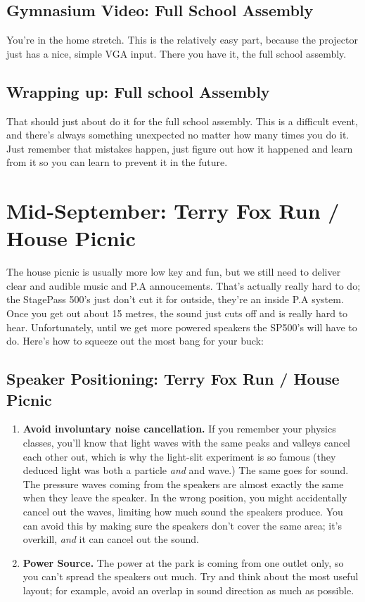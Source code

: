 \documentclass[11pt,a4paper]{book}
\begin{document}
\section{Gymnasium Video: Full School Assembly}
You're in the home stretch. This is the relatively easy part, because the projector just has a nice, simple VGA input. There you have it, the full school assembly.
\section{Wrapping up: Full school Assembly}
That should just about do it for the full school assembly. This is a difficult event, and there's always something unexpected no matter how many times you do it. Just remember that mistakes happen, just figure out how it happened and learn from it so you can learn to prevent it in the future.
\chapter{Mid-September: Terry Fox Run / House Picnic}
The house picnic is usually more low key and fun, but we still need to deliver clear and audible music and P.A annoucements. That's actually really hard to do; the StagePass 500's just don't cut it for outside, they're an inside P.A system. Once you get out about 15 metres, the sound just cuts off and is really hard to hear. Unfortunately, until we get more powered speakers the SP500's will have to do. Here's how to squeeze out the most bang for your buck:
\section{Speaker Positioning: Terry Fox Run / House Picnic}
\begin{enumerate}
\item \textbf{Avoid involuntary noise cancellation.} If you remember your physics classes, you'll know that light waves with the same peaks and valleys cancel each other out, which is why the light-slit experiment is so famous (they deduced light was both a particle \textit{and} and wave.) The same goes for sound. The pressure waves coming from the speakers are almost exactly the same when they leave the speaker. In the wrong position, you might accidentally cancel out the waves, limiting how much sound the speakers produce. You can avoid this by making sure the speakers don't cover the same area; it's overkill, \textit{and} it can cancel out the sound.
\item  \textbf{Power Source.} The power at the park is coming from one outlet only, so you can't spread the speakers out much. Try and think about the most useful layout; for example, avoid an overlap in sound direction as much as possible.
\end{enumerate}
\end{document}
